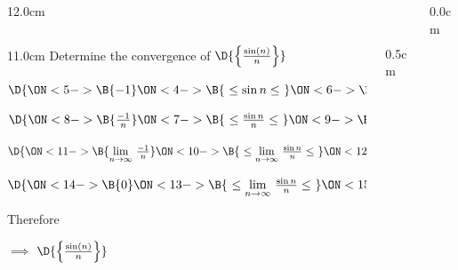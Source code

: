 \begin{frame}
\frametitle{}
\scriptsize
\begin{columns}
\begin{column}{12.0cm}

\vspace{0.2cm}

\begin{columns}
\begin{column}{11.0cm}
\EX Determine the convergence of $\D{\left\{\frac{\sin(n)}{n}\right\}}$\\

\vspace{0.4cm}


\vspace{0.2cm}

\begin{center}
	$\D{
	\ON<5->{\B{-1}} 
	\ON<4->{\B{\,\, \le \sin n \le \,\,}}
	\ON<6->{\B{1}}}$
	
	\vspace{0.2cm}
	
	$\D{
	\ON<8->{\B{\frac{-1}{n}}} 
	\ON<7->{\B{\,\, \le \frac{\sin n}{n} \le \,\,}} 
	\ON<9->{\B{\frac{1}{n}}}}$
	
	\vspace{0.2cm}
	
	$\D{
	\ON<11->{\B{\lim \limits_{n \to \infty}\, \frac{-1}{n}}}
	\ON<10->{\B{\,\, \le \lim \limits_{n \to \infty} \, \frac{\sin n}{n} \le \,\,}}
	\ON<12->{\B{\lim \limits_{n \to \infty}\, \frac{1}{n}}}}$
	
	\vspace{0.2cm}
	
	$\D{
	\ON<14->{\B{0}}
	\ON<13->{\B{\,\, \le \lim \limits_{n \to \infty} \, \frac{\sin n}{n} \le \,\,}}
	\ON<15->{\B{0}}}$
\end{center}

Therefore

\vspace{0.2cm}


\vspace{0.2cm}

\quad $\implies$ \quad $\D{\left\{\frac{\sin(n)}{n}\right\}}$ \quad 
{}

\vspace{1.5cm}

\end{column}
\begin{column}{0.5cm}
	
\end{column}
\end{columns}
\end{column}
\begin{column}{0.0cm}\end{column}
\end{columns}
\end{frame}